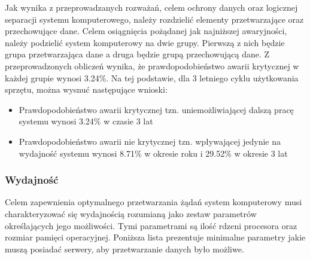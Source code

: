 				\par Jak wynika z przeprowadzanych rozważań, celem ochrony danych oraz logicznej separacji systemu komputerowego, należy rozdzielić elementy przetwarzające oraz przechowujące dane. Celem osiągnięcia pożądanej jak najniższej awaryjności, należy podzielić system komputerowy na dwie grupy. Pierwszą z nich będzie grupa przetwarzająca dane a druga będzie grupą przechowującą dane. Z przeprowadzonych obliczeń wynika, że prawdopodobieństwo awarii krytycznej w każdej grupie wynosi 3.24\%. Na tej podstawie, dla 3 letniego cyklu użytkowania sprzętu, można wysnuć następujące wnioski:
				
				\begin{itemize}
					\item Prawdopodobieństwo awarii krytycznej tzn. uniemożliwiającej dalszą pracę systemu wynosi 3.24\% w czasie 3 lat
					\item Prawdopodobieństwo awarii nie krytycznej tzn. wpływającej jedynie na wydajność systemu wynosi 8.71\% w okresie roku i 29.52\% w okresie 3 lat
				\end{itemize}
			
			\subsubsection{Wydajność}
				\par Celem zapewnienia optymalnego przetwarzania żądań system komputerowy musi charakteryzować się wydajnością rozumianą jako zestaw parametrów określających jego możliwości. Tymi parametrami są ilość rdzeni procesora oraz rozmiar pamięci operacyjnej. Poniższa lista prezentuje minimalne parametry jakie muszą posiadać serwery, aby przetwarzanie danych było możliwe. 
				
